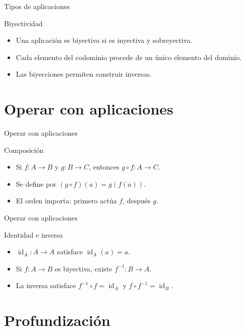 \documentclass[aspectratio=169,11pt]{beamer}
\begin{document}
\begin{frame}{Tipos de aplicaciones}
\begin{block}{Biyectividad}
\begin{itemize}
  \item Una aplicación es biyectiva si es inyectiva y sobreyectiva.
  \item Cada elemento del codominio procede de un único elemento del dominio.
  \item Las biyecciones permiten construir inversas.
\end{itemize}
\end{block}
\end{frame}

\section{Operar con aplicaciones}

\begin{frame}{Operar con aplicaciones}
\begin{block}{Composición}
\begin{itemize}
  \item Si \(f:A\to B\) y \(g:B\to C\), entonces \(g\circ f:A\to C\).
  \item Se define por \((g\circ f)(a)=g(f(a))\).
  \item El orden importa: primero actúa \(f\), después \(g\).
\end{itemize}
\end{block}
\end{frame}

\begin{frame}{Operar con aplicaciones}
\begin{block}{Identidad e inversa}
\begin{itemize}
  \item \(\operatorname{id}_A:A\to A\) satisface \(\operatorname{id}_A(a)=a\).
  \item Si \(f:A\to B\) es biyectiva, existe \(f^{-1}:B\to A\).
  \item La inversa satisface \(f^{-1}\circ f=\operatorname{id}_A\) y \(f\circ f^{-1}=\operatorname{id}_B\).
\end{itemize}
\end{block}
\end{frame}

\section{Profundización}
\end{document}

